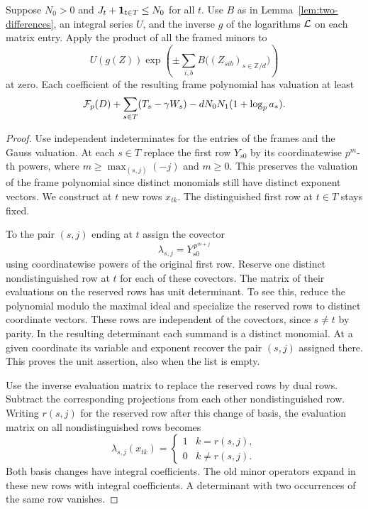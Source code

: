 \begin{proposition}\label{prop:cyclic-jet}
Suppose \(N_0>0\) and \(J_t+{\bf1}_{t\in T}\le N_0\) for all \(t\).
Use \(B\) as in Lemma~\ref{lem:two-differences}, an integral
series \(U\), and the inverse \(g\) of the logarithms \({\cal L}\)
on each matrix entry. Apply the product of all the framed minors
to
\[
          U(g(Z))\exp\!\left(\pm\sum_{i,b}
                        B\big((Z_{sib})_{s\in\mathbb Z/d}\big)\right)
\]
at zero. Each coefficient of the resulting frame polynomial has
valuation at least
\begin{equation}\label{eq:cyclic-gain}
 {\cal F}_p(D)+\sum_{s\in T}(T_s-\gamma W_s)
                    -dN_0N_1(1+\log_p a_*).
\end{equation}
\end{proposition}
\begin{proof}
Use independent indeterminates for the entries of the frames and
the Gauss valuation. At each \(s\in T\) replace the first row
\(Y_{s0}\) by its coordinatewise \(p^m\)-th powers, where
\(m\ge\max_{(s,j)}(-j)\) and \(m\ge0\).
This preserves the valuation of the frame polynomial since
distinct monomials still have distinct exponent vectors. We
construct at \(t\) new rows \(x_{tk}\). The distinguished first
row at \(t\in T\) stays fixed.

To the pair \((s,j)\) ending at
\(t\) assign the covector
\[
                  \lambda_{s,j}=Y_{s0}^{\,p^{m+j}}
\]
using coordinatewise powers of the original first row. Reserve
one distinct nondistinguished row at \(t\) for each of these
covectors. The matrix of their evaluations on the reserved
rows has unit determinant. To see this, reduce the polynomial
modulo the maximal ideal and specialize the reserved rows to
distinct coordinate vectors. These rows are independent of
the covectors, since \(s\ne t\) by parity. In the resulting
determinant each summand is a distinct monomial. At a given
coordinate its variable and exponent recover the pair \((s,j)\)
assigned there. This proves the unit assertion, also when the
list is empty.

Use the inverse evaluation matrix to replace the reserved rows
by dual rows. Subtract the corresponding projections from each
other nondistinguished row. Writing \(r(s,j)\) for the reserved row after this change of basis, the evaluation matrix on all nondistinguished rows becomes
\[
  \lambda_{s,j}(x_{tk})=\begin{cases}1&k=r(s,j),\\0&k\ne r(s,j).\end{cases}
\]
Both basis changes have integral coefficients.
The old minor operators expand in these new rows with integral
coefficients. A determinant with two occurrences of the same
row vanishes.


\end{proof}
